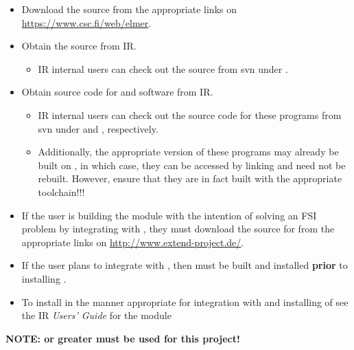 
\begin{itemize}
\item Download the \elmer source from the appropriate links on \url{https://www.csc.fi/web/elmer}.
\item Obtain the \irprogram source from IR.
  \begin{itemize}
  \item IR internal users can check out the source from svn under .
  \end{itemize}
\item Obtain source code for \impact and  software from IR.
  \begin{itemize}
  \item IR internal users can check out the source code for these programs from svn under  and , respectively. 
  \item Additionally, the appropriate version of these programs may already be built on , in which case, they can be accessed by linking and need not be rebuilt. However, ensure that they are in fact built with the appropriate toolchain!!! 
  \end{itemize}
\item If the user is building the module with the intention of solving an FSI problem by integrating with \foam\!\!, they must download the source for \foam {} from the appropriate links on \url{http://www.extend-project.de/}.
\end{itemize}


\begin{itemize}
\item If the user plans to integrate with \foam\!\!, then \foam must be built and installed \textbf{prior} to installing \irprogram\!\!. 
\item To install \foam in the manner appropriate for integration with and installing of \irprogram see the IR \textit{Users' Guide} for the \foam module
\end{itemize}

\textbf{NOTE:  or greater must be used for this project!}


